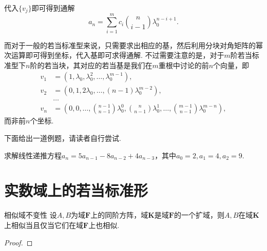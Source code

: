 代入$\{v_j\}$即可得到通解
\[
    a_n = \sum_{i = 1}^m c_i \binom{n}{i - 1} \lambda_0^{n - i + 1}.
\]

而对于一般的若当标准型来说，只需要求出相应的基，然后利用分块对角矩阵的幂次运算即可得到坐标，代入基即可求得通解. 不过需要注意的是，对于$m$阶若当标准型下$n$阶的若当块，其对应的若当基是我们在$m$重根中讨论的前$n$个向量，即
    \begin{align*}
        v_1 & = (1, \lambda_0, \lambda_0^2, \ldots, \lambda_0^{m - 1}), \\ v_2 & = (0, 1, 2 \lambda_0, \ldots, (n - 1) \lambda_0^{m - 2}), \\ & \ldots \\ v_n & = (0, 0, \ldots, \binom{n - 1}{n - 1} \lambda_0^0, \binom{n}{n - 1} \lambda_0^1, \ldots, \binom{m - 1}{n - 1} \lambda_0^{m - n}),
    \end{align*}
    而非前$n$个坐标.

下面给出一道例题，请读者自行尝试.

\begin{example}{}{}
    求解线性递推方程$a_n = 5a_{n - 1} - 8a_{n - 2} + 4a_{n - 3}$，其中$a_0 = 2, a_1 = 4, a_2 = 9$.
\end{example}

\section{实数域上的若当标准形} \label{sec:实数域上的若当标准形}

\begin{theorem}{}{相似域不变性}
    设$A,B$为域$\mathbf{F}$上的同阶方阵，域$\mathbf{K}$是域$\mathbf{F}$的一个扩域，则$A,B$在域$\mathbf{K}$上相似当且仅当它们在域$\mathbf{F}$上也相似.
\end{theorem}
\begin{proof}

\end{proof}

